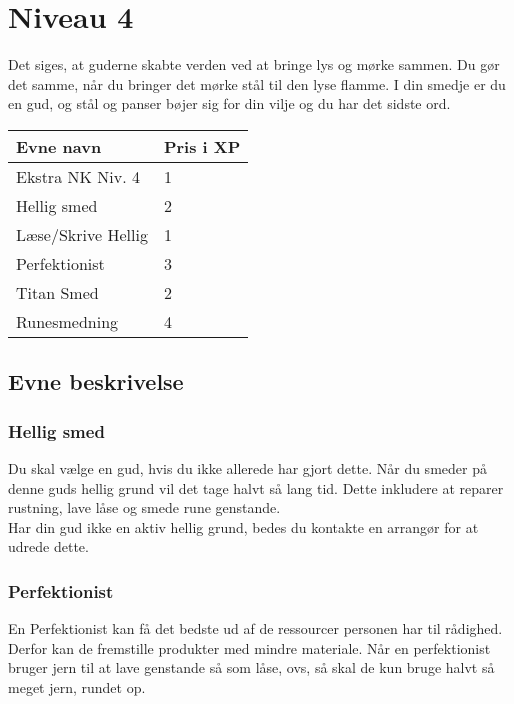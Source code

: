 \chapter{Niveau 4}
Det siges, at guderne skabte verden ved at bringe lys og mørke sammen. Du gør det samme, når du bringer det mørke stål til den lyse flamme. I din smedje er du en gud, og stål og panser bøjer sig for din vilje og du har det sidste ord.\\


\begin{tabular}{|p{}|p{}|}
\hline
\rowcolor{cerulean!40}
    Evne navn & Pris i XP\\ \hline
    Ekstra NK Niv. 4 & 1\\\hline
    Hellig smed & 2 \\\hline
    Læse/Skrive Hellig  & 1\\\hline
    Perfektionist & 3 \\\hline
    Titan Smed & 2 \\\hline
    Runesmedning   & 4\\\hline
\end{tabular}

\section{Evne beskrivelse}



\subsection{Hellig smed}
Du skal vælge en gud, hvis du ikke allerede har gjort dette. Når du smeder på denne guds hellig grund vil det tage halvt så lang tid. Dette inkludere at reparer rustning, lave låse og smede rune genstande.\\
Har din gud ikke en aktiv hellig grund, bedes du kontakte en arrangør for at udrede dette.



\subsection{Perfektionist}
En Perfektionist kan få det bedste ud af de ressourcer personen har til rådighed. Derfor kan de fremstille produkter med mindre materiale. Når en perfektionist bruger jern til at lave genstande så som låse, ovs, så skal de kun bruge halvt så meget jern, rundet op.\\

